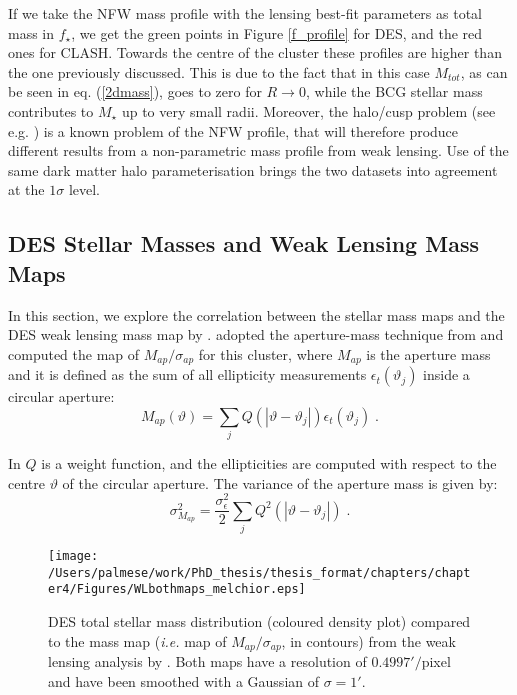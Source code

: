 {If we take the NFW mass profile with the lensing best-fit parameters as total mass in $f_{\star}$, we get the green points in Figure \ref{f_profile} for DES, and the red ones for CLASH. Towards the centre of the cluster these profiles are higher than the one previously discussed. This is due to the fact that in this case $M_{tot}$, as  can be seen in eq. (\ref{2dmass}), goes to zero for $R \to 0$, while the BCG stellar mass contributes to $M_\star$ up to very small radii. Moreover, the halo/cusp problem (see e.g. \citealt{cusp}) is a known problem of the NFW profile, that will therefore produce different results from a non-parametric mass profile from weak lensing. Use of the same dark matter halo parameterisation brings the two datasets into agreement at the $1\sigma$ level.


\subsection{DES Stellar Masses and Weak Lensing Mass Maps}\label{sec:maps}
In this section, we explore the correlation between the stellar mass maps and the DES weak lensing mass map by \citet{melchior}.
\citet{melchior} adopted the aperture-mass technique from \citet{schneider1996} and computed the map of $M_{ap}/\sigma_{ap}$ for this cluster, where $M_{ap}$ is the aperture mass and it is defined as the sum of all ellipticity measurements $\epsilon_t(\vartheta_j)$ inside a circular aperture:
\begin{equation}
M_{ap}(\vartheta)=\sum_jQ(|\vartheta - \vartheta_j|)\epsilon_t(\vartheta_j)\;.\label{mapeq}
\end{equation}

In  $Q$ is a weight function, and the ellipticities are computed with respect to the centre $\vartheta$ of the circular aperture. The variance of the aperture mass is given by:
\begin{equation}
\sigma^2_{M_{ap}}=\frac{\sigma_{\epsilon}^2}{2}\sum_jQ^2(|\vartheta - \vartheta_j|)\;.
\end{equation}

\begin{figure}
\centering
\texttt{[image: /Users/palmese/work/PhD\_thesis/thesis\_format/chapters/chapter4/Figures/WLbothmaps\_melchior.eps]}
\caption{DES total stellar mass distribution (coloured density plot) compared to the mass map (\emph{i.e.} map of $M_{ap}/\sigma_{ap}$, in contours) from the weak lensing analysis by \protect\citet{melchior}. Both maps have a resolution of $0.4997'/$pixel and have been smoothed with a Gaussian of $\sigma = 1'$.}\label{densitymapsWL}
\end{figure}

}
